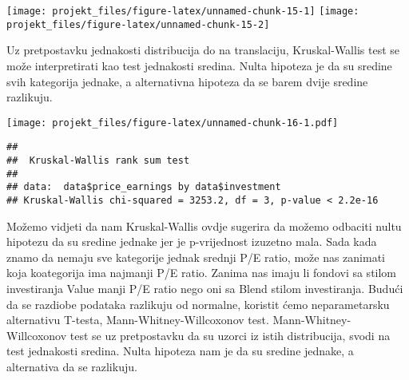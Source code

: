 \documentclass[
]{article}
\newenvironment{Shaded}{\begin{snugshade}}{\end{snugshade}}
\newcommand{\DataTypeTok}[1]{\textcolor[rgb]{0.13,0.29,0.53}{#1}}
\newcommand{\KeywordTok}[1]{\textcolor[rgb]{0.13,0.29,0.53}{\textbf{#1}}}
\newcommand{\NormalTok}[1]{#1}
\newcommand{\OperatorTok}[1]{\textcolor[rgb]{0.81,0.36,0.00}{\textbf{#1}}}
\newcommand{\StringTok}[1]{\textcolor[rgb]{0.31,0.60,0.02}{#1}}
\begin{document}
\texttt{[image: projekt\_files/figure-latex/unnamed-chunk-15-1]}
\texttt{[image: projekt\_files/figure-latex/unnamed-chunk-15-2]}

Uz pretpostavku jednakosti distribucija do na translaciju,
Kruskal-Wallis test se može interpretirati kao test jednakosti sredina.
Nulta hipoteza je da su sredine svih kategorija jednake, a alternativna
hipoteza da se barem dvije sredine razlikuju.

\begin{Shaded}
\end{Shaded}

\texttt{[image: projekt\_files/figure-latex/unnamed-chunk-16-1.pdf]}

\begin{Shaded}
\end{Shaded}

\begin{verbatim}
## 
##  Kruskal-Wallis rank sum test
## 
## data:  data$price_earnings by data$investment
## Kruskal-Wallis chi-squared = 3253.2, df = 3, p-value < 2.2e-16
\end{verbatim}

Možemo vidjeti da nam Kruskal-Wallis ovdje sugerira da možemo odbaciti
nultu hipotezu da su sredine jednake jer je p-vrijednost izuzetno mala.
Sada kada znamo da nemaju sve kategorije jednak srednji P/E ratio, može
nas zanimati koja koategorija ima najmanji P/E ratio. Zanima nas imaju
li fondovi sa stilom investiranja Value manji P/E ratio nego oni sa
Blend stilom investiranja. Budući da se razdiobe podataka razlikuju od
normalne, koristit ćemo neparametarsku alternativu T-testa,
Mann-Whitney-Willcoxonov test. Mann-Whitney-Willcoxonov test se uz
pretpostavku da su uzorci iz istih distribucija, svodi na test
jednakosti sredina. Nulta hipoteza nam je da su sredine jednake, a
alternativa da se razlikuju.
\end{document}
